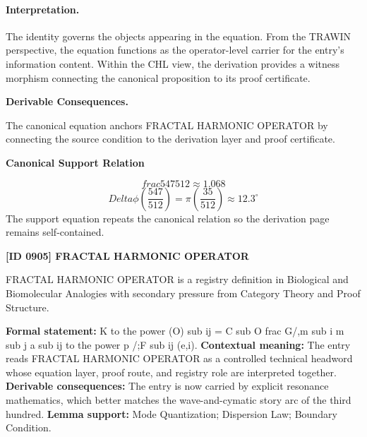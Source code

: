\paragraph{Interpretation.}
The identity governs the objects appearing in the equation. From the TRAWIN perspective, the equation functions as the operator-level carrier for the entry’s information content. Within the CHL view, the derivation provides a witness morphism connecting the canonical proposition to its proof certificate.

\par\vspace{0.35em}
\noindent\textbf{Derivable Consequences.}\quad
\begingroup
\footnotesize
\raggedright
The canonical equation anchors FRACTAL HARMONIC OPERATOR by connecting the source condition to the derivation layer and proof certificate.
\par\endgroup

\noindent\textbf{Canonical Support Relation}\par
\[
frac{547}{512} \approx 1.068
\]
\[
Delta\phi\left(\frac{547}{512}\right) = \pi\left(\frac{35}{512}\right) \approx 12.3^\circ
\]
\noindent The support equation repeats the canonical relation so the derivation page remains self-contained.\par

\clearpage
\noindent\textbf{[ID 0905] FRACTAL HARMONIC OPERATOR}\par
\vspace{0.35em}
\begingroup\small
{}
FRACTAL HARMONIC OPERATOR is a registry definition in Biological and Biomolecular Analogies with secondary pressure from Category Theory and Proof Structure.

\begingroup\footnotesize\setlength{\emergencystretch}{3em}\sloppy
\textbf{Formal statement:} K to the power (O) sub ij = C sub O frac G/,m sub i m sub j a sub ij to the power p /;F sub ij (e,i). \textbf{Contextual meaning:} The entry reads FRACTAL HARMONIC OPERATOR as a controlled technical headword whose equation layer, proof route, and registry role are interpreted together. \textbf{Derivable consequences:} The entry is now carried by explicit resonance mathematics, which better matches the wave-and-cymatic story arc of the third hundred. \textbf{Lemma support:} Mode Quantization; Dispersion Law; Boundary Condition.\par
\endgroup

